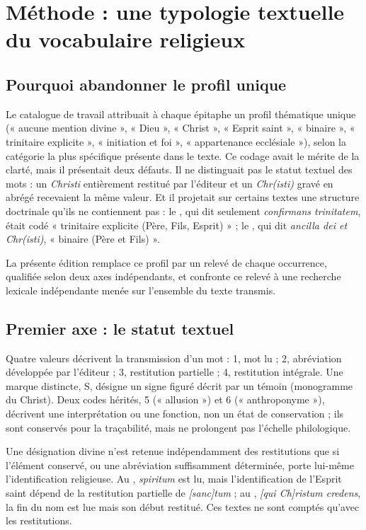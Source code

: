 \chapter{Méthode : une typologie textuelle du vocabulaire religieux}\label{ch:typologie}

\section{Pourquoi abandonner le profil unique}

Le catalogue de travail attribuait à chaque épitaphe un profil thématique unique (« aucune mention divine », « Dieu », « Christ », « Esprit saint », « binaire », « trinitaire explicite », « initiation et foi », « appartenance ecclésiale »), selon la catégorie la plus spécifique présente dans le texte. Ce codage avait le mérite de la clarté, mais il présentait deux défauts. Il ne distinguait pas le statut textuel des mots : un \emph{Christi} entièrement restitué par l’éditeur et un \emph{Chr(isti)} gravé en abrégé recevaient la même valeur. Et il projetait sur certains textes une structure doctrinale qu’ils ne contiennent pas : le , qui dit seulement \emph{confirmans trinitatem}, était codé « trinitaire explicite (Père, Fils, Esprit) » ; le , qui dit \emph{ancilla dei et Chr(isti)}, « binaire (Père et Fils) ».

La présente édition remplace ce profil par un relevé de chaque occurrence, qualifiée selon deux axes indépendants, et confronte ce relevé à une recherche lexicale indépendante menée sur l’ensemble du texte transmis.

\section{Premier axe : le statut textuel}

Quatre valeurs décrivent la transmission d’un mot : 1, mot lu ; 2, abréviation développée par l’éditeur ; 3, restitution partielle ; 4, restitution intégrale. Une marque distincte, S, désigne un signe figuré décrit par un témoin (monogramme du Christ). Deux codes hérités, 5 (« allusion ») et 6 (« anthroponyme »), décrivent une interprétation ou une fonction, non un état de conservation ; ils sont conservés pour la traçabilité, mais ne prolongent pas l’échelle philologique.

Une désignation divine n’est retenue indépendamment des restitutions que si l’élément conservé, ou une abréviation suffisamment déterminée, porte lui-même l’identification religieuse. Au , \emph{spiritum} est lu, mais l’identification de l’Esprit saint dépend de la restitution partielle de \emph{[sanc]tum} ; au , \emph{[qui Ch]ristum credens}, la fin du nom est lue mais son début restitué. Ces textes ne sont comptés qu’avec les restitutions.

